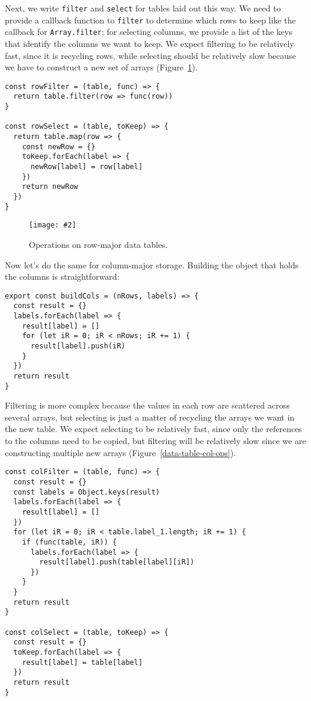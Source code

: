 \documentclass[krantzl]{krantz}
\newcommand{\figpdf}[4]{\begin{figure}%
\centering%
\texttt{[image: \#2]}%
\caption{#3}%
\label{#1}%
\end{figure}}
\newcommand{\figref}[1]{Figure~\ref{#1}}
\begin{document}
Next,
we write \texttt{filter} and \texttt{select} for tables laid out this way.
We need to provide a callback function to \texttt{filter} to determine which rows to keep
like the callback for \texttt{Array.filter};
for selecting columns,
we provide a list of the keys that identify the columns we want to keep.
We expect filtering to be relatively fast,
since it is recycling rows,
while selecting should be relatively slow because we have to construct a new set of arrays
(\figref{data-table-row-ops}).


\begin{lstlisting}[frame=tblr]
const rowFilter = (table, func) => {
  return table.filter(row => func(row))
}

const rowSelect = (table, toKeep) => {
  return table.map(row => {
    const newRow = {}
    toKeep.forEach(label => {
      newRow[label] = row[label]
    })
    return newRow
  })
}
\end{lstlisting}


\figpdf{data-table-row-ops}{./data-table/row-ops.pdf}{Operations on row-major data tables.}{0.6}


Now let’s do the same for column-major storage.
Building the object that holds the columns is straightforward:


\begin{lstlisting}[frame=tblr]
export const buildCols = (nRows, labels) => {
  const result = {}
  labels.forEach(label => {
    result[label] = []
    for (let iR = 0; iR < nRows; iR += 1) {
      result[label].push(iR)
    }
  })
  return result
}
\end{lstlisting}



Filtering is more complex because the values in each row are scattered across several arrays,
but selecting is just a matter of recycling the arrays we want in the new table.
We expect selecting to be relatively fast,
since only the references to the columns need to be copied,
but filtering will be relatively slow since we are constructing multiple new arrays
(\figref{data-table-col-ops}).


\begin{lstlisting}[frame=tblr]
const colFilter = (table, func) => {
  const result = {}
  const labels = Object.keys(result)
  labels.forEach(label => {
    result[label] = []
  })
  for (let iR = 0; iR < table.label_1.length; iR += 1) {
    if (func(table, iR)) {
      labels.forEach(label => {
        result[label].push(table[label][iR])
      })
    }
  }
  return result
}

const colSelect = (table, toKeep) => {
  const result = {}
  toKeep.forEach(label => {
    result[label] = table[label]
  })
  return result
}
\end{lstlisting}
\end{document}

